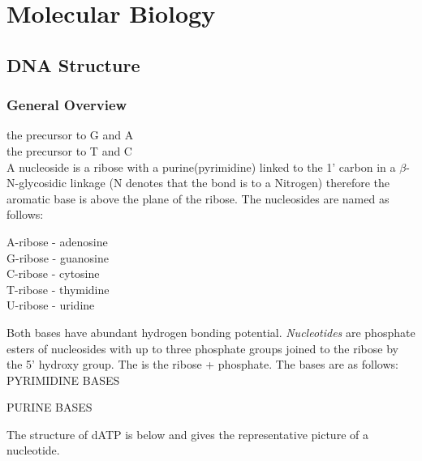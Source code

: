 \documentclass[../Bio_chemistryReview.tex]{subfiles}
\begin{document}
\chapter{Molecular Biology}

\section{DNA Structure} 

\subsection{General Overview}

 the precursor to G and A\\
 the precursor to T and C\\
A nucleoside is a ribose with a purine(pyrimidine) linked to the 1' carbon in a
$ \beta $-N-glycosidic linkage (N denotes that the bond is to a Nitrogen)
therefore the aromatic base is above the plane of the ribose. The nucleosides
are named as follows: 
\begin{multicols}{3}
  \setlength{\parindent}{0pt}
  \begin{center}
    A-ribose - adenosine\\
    G-ribose - guanosine\\
    C-ribose - cytosine\\
    T-ribose - thymidine\\
    U-ribose - uridine\\
  \end{center}
\end{multicols}

Both bases have abundant hydrogen bonding potential. \emph{Nucleotides} are
phosphate esters of nucleosides with up to three phosphate groups joined to the
ribose by the 5' hydroxy group. The  is the ribose + phosphate.
The bases are as follows:\newline 
\hfill \newline
PYRIMIDINE BASES
\begin{figure}[h]
  \centering
  \setatomsep{2em}
   \qquad
  \qquad {}
\end{figure}
\newline
PURINE BASES
\begin{figure}[h]
  \centering
  \setatomsep{2em}
   \qquad
\end{figure}
\newpage
The structure of dATP is below and gives the representative picture of a nucleotide.
\end{document}
